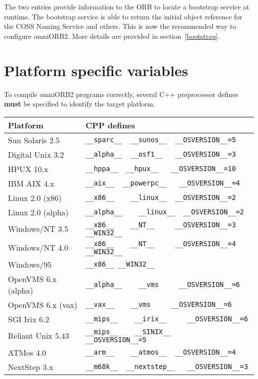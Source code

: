 \documentclass[11pt,twoside,onecolumn]{book}
\begin{document}
The two entries provide information to the ORB to locate a bootstrap
service at runtime. The bootstrap service is able to return the initial
object reference for the COSS Naming Service and others. This is now the
recommended way to configure omniORB2. More details are provided in
section~\ref{bootstrap}.



\section{Platform specific variables}

To compile omniORB2 programs correctly, several C++ preprocessor defines
{\bf must} be specified to identify the target platform.

\begin{flushleft}
\begin{tabular}{|l|l|}
\hline
Platform & CPP defines \\
\hline
Sun Solaris 2.5  & \verb|__sparc__  __sunos__  __OSVERSION__=5| \\
\hline
Digital Unix 3.2 & \verb|__alpha__  __osf1__   __OSVERSION__=3| \\
\hline
HPUX 10.x & \verb|__hppa__  __hpux__   __OSVERSION__=10| \\
\hline
IBM AIX 4.x & \verb|__aix__  __powerpc__   __OSVERSION__=4| \\
\hline
Linux 2.0 (x86)  & \verb|__x86__    __linux__  __OSVERSION__=2| \\
\hline
Linux 2.0 (alpha)  & \verb|__alpha__    __linux__  __OSVERSION__=2| \\
\hline
Windows/NT 3.5   & \verb|__x86__    __NT__     __OSVERSION__=3  __WIN32__| \\
\hline
Windows/NT 4.0   & \verb|__x86__    __NT__     __OSVERSION__=4  __WIN32__| \\
\hline
Windows/95   & \verb|__x86__ __WIN32__| \\
\hline
OpenVMS 6.x (alpha) & \verb|__alpha__    __vms     __OSVERSION__=6 | \\
\hline
OpenVMS 6.x (vax)   & \verb|__vax__    __vms     __OSVERSION__=6 | \\
\hline
SGI Irix 6.2 & \verb|__mips__    __irix__     __OSVERSION__=6 | \\
\hline
Reliant Unix 5.43 & \verb|__mips__    __SINIX__     __OSVERSION__=5 | \\
\hline
ATMos 4.0        & \verb|__arm__    __atmos__  __OSVERSION__=4| \\
\hline
NextStep 3.x & \verb|__m68k__  __nextstep__   __OSVERSION__=3| \\
\hline
\end{tabular}
\end{flushleft}
\end{document}

